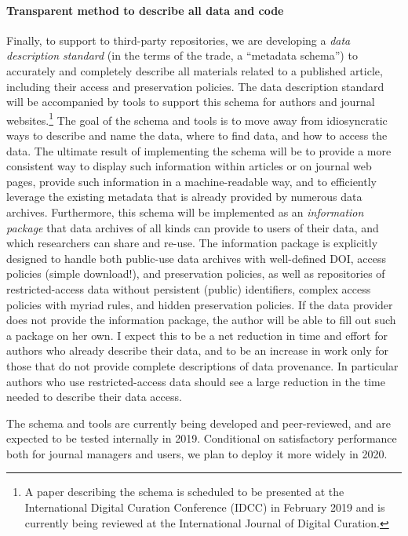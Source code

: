 \documentclass[AEJ]{AEA}
\begin{document}
\paragraph{Transparent method to describe all data and code} Finally, to  support to third-party repositories, we are developing a \textit{data description standard} (in the terms of the trade, a ``metadata schema'') to accurately and completely describe all materials related to a published article, including their access and preservation policies. The data description standard will be accompanied by  tools to support this schema for authors and journal websites.\footnote{A paper describing the schema \citep{VilhuberInt.J.Digit.Curation2019} is scheduled to be presented at the International Digital Curation Conference (IDCC) in February 2019 and is currently being reviewed at the International Journal of Digital Curation.} 
The goal of the schema and tools is to move away from idiosyncratic ways to describe and name the data, where to find data, and how to access the data. The ultimate result of implementing the schema will be to provide a more consistent way to display such information within articles or on journal web pages, provide such information in a machine-readable way, and to efficiently leverage the existing metadata that is already provided by numerous data archives. Furthermore, this schema will be implemented as an \textit{information package} that data archives of all kinds can provide to users of their data, and which researchers can share and re-use. The information package is explicitly designed to handle both public-use data archives with well-defined \ac{DOI}, access policies (simple download!), and preservation policies, as well as repositories of restricted-access data without persistent (public) identifiers, complex access policies with myriad rules, and hidden preservation policies. If the data provider does not provide the information package, the author will be able to fill out such a package on her own. I expect this to be a net reduction in time and effort for authors who already describe their data, and to be an increase in work only for those that do not provide complete descriptions of data provenance. In particular authors who use restricted-access data should see a large reduction in the time needed to describe their data access. 

The schema and tools are currently being developed and peer-reviewed, and are expected to be tested  internally in 2019. Conditional on satisfactory performance both for journal managers and users, we plan to deploy it more widely in 2020. 
\end{document}
